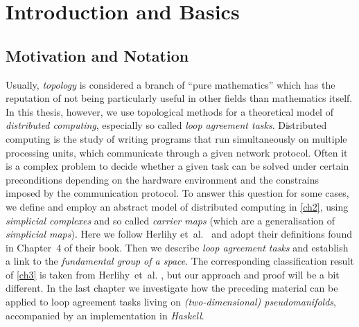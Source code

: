 \chapter{Introduction and Basics}
%
\section{Motivation and Notation}
Usually, \emph{topology} is considered a branch of \enquote{pure mathematics}
which has the reputation of not being particularly useful in other fields than
mathematics itself. In this thesis, however, we use topological methods for
a theoretical model of \emph{distributed computing}, especially so called
\emph{loop agreement tasks}. Distributed computing is the study of writing
programs that run simultaneously on multiple processing units, which
communicate through a given network protocol. Often it is a complex problem to
decide whether a given task can be solved under certain preconditions depending
on the hardware environment and the constrains imposed by the communication
protocol. To answer this question for some cases, we define and employ an
abstract model of distributed computing in \cref{ch2}, using \emph{simplicial
complexes} and so called \emph{carrier maps} (which are a generalisation of
\emph{simplicial maps}). Here we follow 
Herlihy et~al.~\cite{bookc:herlihyetal13} and adopt their definitions found
in Chapter~4 of their book. Then we describe \emph{loop agreement
tasks} and establish a link to the \emph{fundamental group of a space}. The
corresponding classification result of \cref{ch3} is taken from Herlihy~et~al.
\cite[Ch.~15]{bookc:herlihyetal13}\cite{paper:herlihyrajsbaum03}, but our
approach and proof will be a bit different. In the last chapter we investigate
how the preceding material can be applied to loop agreement tasks living on
\emph{(two-dimensional) pseudomanifolds}, accompanied by an implementation in
\emph{Haskell}.

